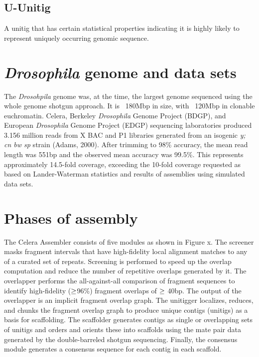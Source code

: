 \documentclass{article}
\begin{document}
\subsection{U-Unitig}
  A unitig that has certain statistical properties indicating it is highly likely to represent uniquely occurring genomic sequence.


\section{\emph{Drosophila} genome and data sets}
The \emph{Drosohpila} genome was, at the time, the largest genome
sequenced using the whole genome shotgun approach. It is ~180Mbp in
size, with ~120Mbp in clonable euchromatin. Celera, Berkeley
\emph{Drosophila} Genome Project (BDGP), and European
\emph{Drosophila} Genome Project (EDGP) sequencing laboratories
produced 3.156 million reads from X BAC and P1 libraries generated
from an isogenic \emph{y; cn bw sp} strain (Adams, 2000).  After
trimming to 98\% accuracy, the mean read length was 551bp and the
observed mean accuracy was 99.5\%. This represents approximately
14.5-fold coverage, exceeding the 10-fold coverage requested as based
on Lander-Waterman statistics and results of assemblies using
simulated data sets.


\section{Phases of assembly}
The Celera Assembler consists of five modules as shown in Figure
x. The screener masks fragment intervals that have high-fidelity local
alignment matches to any of a curated set of repeats. Screening is
performed to speed up the overlap computation and reduce the number of
repetitive overlaps generated by it. The overlapper performs the
all-against-all comparison of fragment sequences to identify
high-fidelity ($\mathnormal{\ge}$96\%) fragment overlaps of
$\mathnormal{\ge}$ 40bp. The output of the overlapper is an implicit
fragment overlap graph. The unitigger localizes, reduces, and chunks
the fragment overlap graph to produce unique contigs (unitigs) as a
basis for scaffolding. The scaffolder generates contigs as single or
overlapping sets of unitigs and orders and orients these into
scaffolds using the mate pair data generated by the double-barreled
shotgun sequencing. Finally, the consensus module generates a
consensus sequence for each contig in each scaffold.
\end{document}
